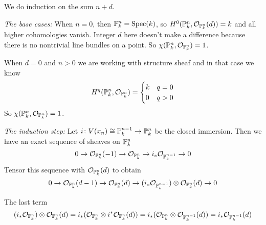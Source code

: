 \begin{exercise}{3}
\begin{enumerate}
{                We do induction on the sum $n + d$.

                \emph{The base cases:}
                When $n = 0$, then $\mathbb{P}^n_k = \operatorname{Spec}(k)$, so $H^0(\mathbb{P}^n_k,
                \mathcal{O}_{\mathbb{P}^n_k}(d)) = k$ and all higher cohomologies
                vanish. Integer $d$ here doesn't make a difference because there
                is no nontrivial line bundles on a point.
                So $\chi(\mathbb{P}^n_k, \mathcal{O}_{\mathbb{P}^n_k}) = 1$.

                When $d = 0$ and $n > 0$ we are working with structure
                sheaf and in that case we know
                \begin{equation*}
                    H^q(\mathbb{P}^n_k, \mathcal{O}_{\mathbb{P}^n_k})
                    = \begin{cases}
                        k & q = 0\\
                        0 & q > 0
                    \end{cases}
                \end{equation*}
                So $\chi(\mathbb{P}^n_k, \mathcal{O}_{\mathbb{P}^n_k}) = 1$.

                \emph{The induction step:}
                Let $i \colon V(x_n) \cong \mathbb{P}^{n-1}_k \to \mathbb{P}^n_k$ be the closed
                immersion.
                Then we have an exact sequence of sheaves on $\mathbb{P}^n_k$
                \begin{equation*}
                    0 \to \mathcal{O}_{\mathbb{P}^n_k}(-1) \to
                    \mathcal{O}_{\mathbb{P}^n_k} \to i_* \mathcal{O}_{\mathbb{P}^{n-1}_k}
                    \to 0
                \end{equation*}
                Tensor this sequence with $\mathcal{O}_{\mathbb{P}^n_k}(d)$ to obtain
                \begin{equation*}
                    0 \to \mathcal{O}_{\mathbb{P}^n_k}(d-1) \to
                    \mathcal{O}_{\mathbb{P}^n_k}(d) \to (i_*
                    \mathcal{O}_{\mathbb{P}^{n-1}_k}) \otimes
                    \mathcal{O}_{\mathbb{P}^n_k}(d) \to 0
                \end{equation*}

                The last term
                \begin{equation*}
                    (i_* \mathcal{O}_{\mathbb{P}^n_k}) \otimes \mathcal{O}_{\mathbb{P}^n_k}(d) = 
                    i_* (\mathcal{O}_{\mathbb{P}^n_k} \otimes i^*
                    \mathcal{O}_{\mathbb{P}^n_k}(d)) = 
                    i_* (\mathcal{O}_{\mathbb{P}^n_k} \otimes \mathcal{O}_{\mathbb{P}^{n-1}_k}(d)) = 
                    i_* \mathcal{O}_{\mathbb{P}^{n-1}_k}(d)
                \end{equation*}

}
\end{enumerate}
\end{exercise}
